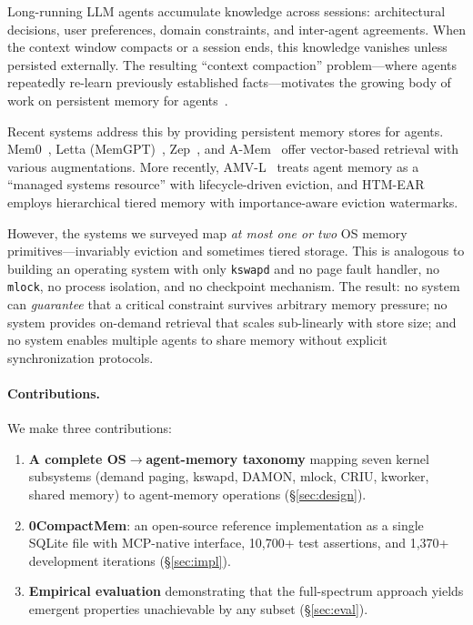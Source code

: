\documentclass[10pt,twocolumn]{article}
\begin{document}
Long-running LLM agents accumulate knowledge across sessions: architectural decisions, user preferences, domain constraints, and inter-agent agreements. When the context window compacts or a session ends, this knowledge vanishes unless persisted externally. The resulting ``context compaction'' problem---where agents repeatedly re-learn previously established facts---motivates the growing body of work on persistent memory for agents~\cite{longmemeval2024,memgpt2023}.

Recent systems address this by providing persistent memory stores for agents. Mem0~\cite{mem0}, Letta (MemGPT)~\cite{memgpt2023}, Zep~\cite{zep2024}, and A-Mem~\cite{amem2025} offer vector-based retrieval with various augmentations. More recently, AMV-L~\cite{amvl2026} treats agent memory as a ``managed systems resource'' with lifecycle-driven eviction, and HTM-EAR~\cite{htmear2026} employs hierarchical tiered memory with importance-aware eviction watermarks.

However, the systems we surveyed map \emph{at most one or two} OS memory primitives---invariably eviction and sometimes tiered storage. This is analogous to building an operating system with only \texttt{kswapd} and no page fault handler, no \texttt{mlock}, no process isolation, and no checkpoint mechanism. The result: no system can \emph{guarantee} that a critical constraint survives arbitrary memory pressure; no system provides on-demand retrieval that scales sub-linearly with store size; and no system enables multiple agents to share memory without explicit synchronization protocols.

\paragraph{Contributions.} We make three contributions:
\begin{enumerate}[leftmargin=*,nosep]
  \item \textbf{A complete OS$\to$agent-memory taxonomy} mapping seven kernel subsystems (demand paging, kswapd, DAMON, mlock, CRIU, kworker, shared memory) to agent-memory operations (\S\ref{sec:design}).
  \item \textbf{0CompactMem}: an open-source reference implementation as a single SQLite file with MCP-native interface, 10{,}700+ test assertions, and 1{,}370+ development iterations (\S\ref{sec:impl}).
  \item \textbf{Empirical evaluation} demonstrating that the full-spectrum approach yields emergent properties unachievable by any subset (\S\ref{sec:eval}).
\end{enumerate}
\end{document}
